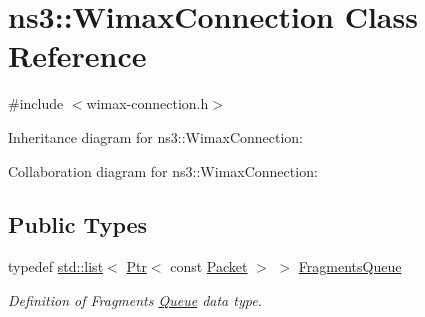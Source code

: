 \hypertarget{classns3_1_1WimaxConnection}{}\section{ns3\+:\+:Wimax\+Connection Class Reference}
\label{classns3_1_1WimaxConnection}


{\ttfamily \#include $<$wimax-\/connection.\+h$>$}



Inheritance diagram for ns3\+:\+:Wimax\+Connection\+:


Collaboration diagram for ns3\+:\+:Wimax\+Connection\+:
\subsection*{Public Types}
\begin{DoxyCompactItemize}
\item 
typedef \hyperlink{openflow-interface_8h_afd9bcfa176617760671b67580f536fa7}{std\+::list}$<$ \hyperlink{classns3_1_1Ptr}{Ptr}$<$ const \hyperlink{classns3_1_1Packet}{Packet} $>$ $>$ \hyperlink{classns3_1_1WimaxConnection_acebd6aa95ab519f5e19bd1773f62e506}{Fragments\+Queue}
\begin{DoxyCompactList}\small\item\em Definition of Fragments \hyperlink{classns3_1_1Queue}{Queue} data type. \end{DoxyCompactList}\end{DoxyCompactItemize}
